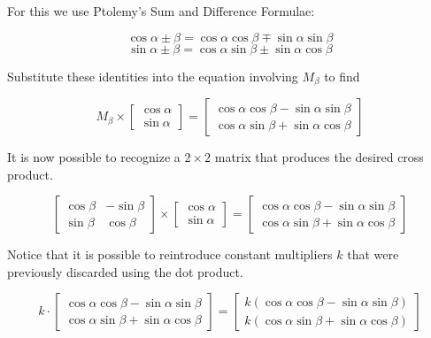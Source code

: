 \documentclass{book}
\begin{document}
For this we use Ptolemy's Sum and Difference Formulae:

\begin{equation*}
\cos{\alpha \pm \beta} = \cos{\alpha}\cos{\beta} \mp \sin{\alpha}\sin{\beta}
\end{equation*}
\begin{equation*}
\sin{\alpha \pm \beta} = \cos{\alpha}\sin{\beta} \pm \sin{\alpha}\cos{\beta}
\end{equation*}

Substitute these identities into the equation involving $M_\beta$ to find

\begin{equation*}M_{\beta} \times \begin{bmatrix}\cos{\alpha} \\ \sin{\alpha}\end{bmatrix} = \begin{bmatrix}\cos{\alpha}\cos{\beta} - \sin{\alpha}\sin{\beta} \\ \cos{\alpha}\sin{\beta} + \sin{\alpha}\cos{\beta}\end{bmatrix}\end{equation*}

It is now possible to recognize a $2 \times 2$ matrix that produces the desired cross product.

\begin{equation*}
\begin{bmatrix}\cos{\beta} & - \sin{\beta} \\ \sin{\beta} & \cos{\beta}\end{bmatrix}
\times \begin{bmatrix}\cos{\alpha} \\ \sin{\alpha}\end{bmatrix} = \begin{bmatrix}\cos{\alpha}\cos{\beta} - \sin{\alpha}\sin{\beta} \\ \cos{\alpha}\sin{\beta} + \sin{\alpha}\cos{\beta}\end{bmatrix}\end{equation*}

Notice that it is possible to reintroduce constant multipliers $k$ that were previously discarded using the dot product.

\begin{equation*}k \cdot \begin{bmatrix}\cos{\alpha}\cos{\beta} - \sin{\alpha}\sin{\beta} \\ \cos{\alpha}\sin{\beta} + \sin{\alpha}\cos{\beta}\end{bmatrix} = \begin{bmatrix}k ( \cos{\alpha}\cos{\beta} - \sin{\alpha}\sin{\beta} ) \\ k (\cos{\alpha}\sin{\beta} + \sin{\alpha}\cos{\beta})\end{bmatrix}\end{equation*}
\end{document}
